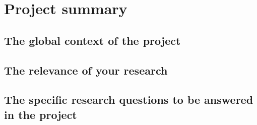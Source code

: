 \chapter{Project summary}
\lipsum[1]

\section[Global context]{The global context of the project}
\lipsum[2]

\section[Relevance]{The relevance of your research}
\lipsum[3]

\section[Research questions]{The specific research questions to be answered in the project}
\lipsum[4]
